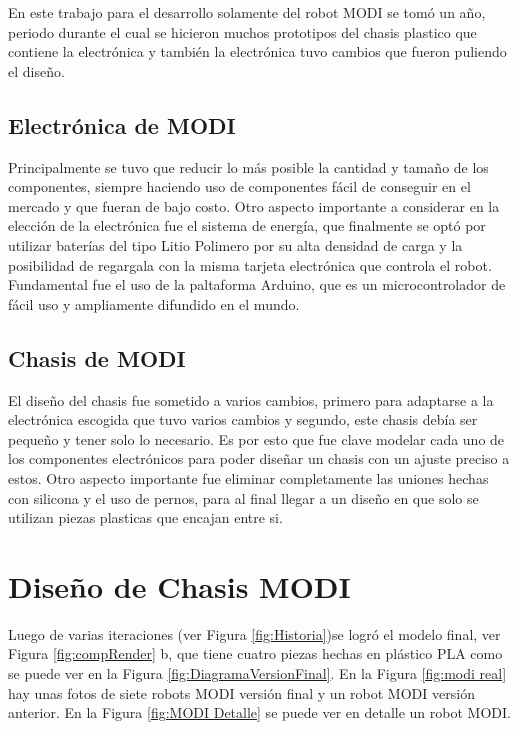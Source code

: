 En este trabajo para el desarrollo solamente del robot MODI se tomó un año, periodo durante el cual se hicieron muchos prototipos del chasis plastico que contiene la electrónica y también la electrónica tuvo cambios que fueron puliendo el diseño. 
\subsection{Electrónica de MODI}
Principalmente se tuvo que reducir lo más posible la cantidad y tamaño de los componentes, siempre haciendo uso de componentes fácil de conseguir en el mercado y que fueran de bajo costo. Otro aspecto importante a considerar en la elección de la electrónica fue el sistema de energía, que finalmente se optó por utilizar baterías del tipo Litio Polimero por su alta densidad de carga y la posibilidad de regargala con la misma tarjeta electrónica que controla el robot. Fundamental fue el uso de la paltaforma Arduino, que es un microcontrolador de fácil uso y ampliamente difundido en el mundo.
\subsection{Chasis de MODI}
El diseño del chasis fue sometido a varios cambios, primero para adaptarse a la electrónica escogida que tuvo varios cambios y segundo, este chasis debía ser pequeño y tener solo lo necesario. Es por esto que fue clave modelar cada uno de los componentes electrónicos para poder diseñar un chasis con un ajuste preciso a estos. Otro aspecto importante fue eliminar completamente las uniones hechas con silicona y el uso de pernos, para al final llegar a un diseño en que solo se utilizan piezas plasticas que encajan entre si.

\section{Diseño de Chasis MODI}
Luego de varias iteraciones (ver Figura \ref{fig:Historia})se logró el modelo final, ver Figura \ref{fig:compRender} b, que tiene cuatro piezas hechas en plástico PLA como se puede ver en la Figura \ref{fig:DiagramaVersionFinal}. En la Figura \ref{fig:modi real} hay unas fotos de siete robots MODI versión final y un robot MODI versión anterior. En la Figura \ref{fig:MODI Detalle} se puede ver en detalle un robot MODI.

